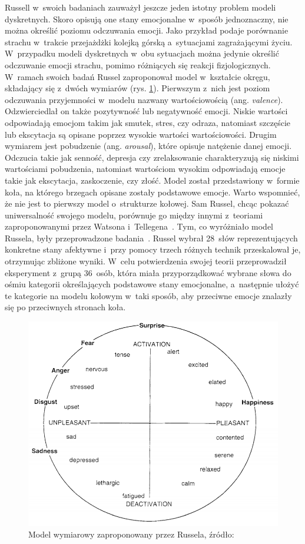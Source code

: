 Russell w~swoich badaniach zauważył jeszcze jeden istotny problem modeli dyskretnych. Skoro opisują one stany emocjonalne w~sposób jednoznaczny, nie można określić poziomu odczuwania emocji. Jako przykład podaje porównanie strachu w~trakcie przejażdżki kolejką górską a~sytuacjami zagrażającymi życiu. W~przypadku modeli dyskretnych w~obu sytuacjach można jedynie określić odczuwanie emocji strachu, pomimo różniących się reakcji fizjologicznych. W~ramach swoich badań Russel zaproponował model w~kształcie okręgu, składający się z~dwóch wymiarów (rys. \ref{fig:circumplex}). Pierwszym z~nich jest poziom odczuwania przyjemności w~modelu nazwany wartościowością (ang. \textit{valence}). Odzwierciedlał on także pozytywność lub negatywność emocji. Niskie wartości odpowiadają emocjom takim jak smutek, stres, czy odraza, natomiast szczęście lub ekscytacja są opisane poprzez wysokie wartości wartościowości. Drugim wymiarem jest pobudzenie (ang. \textit{arousal}), które opisuje natężenie danej emocji. Odczucia takie jak senność, depresja czy zrelaksowanie charakteryzują się niskimi wartościami pobudzenia, natomiast wartościom wysokim odpowiadają emocje takie jak ekscytacja, zaskoczenie, czy złość. Model został przedstawiony w~formie koła, na którego brzegach opisane zostały podstawowe emocje. Warto wspomnieć, że nie jest to pierwszy model o~strukturze kołowej. Sam Russel, chcąc pokazać uniwersalność swojego modelu, porównuje go między innymi z~teoriami zaproponowanymi przez Watsona i~Tellegena~\cite{Watson_1985}. Tym, co wyróżniało model Russela, były przeprowadzone badania~\cite{circumplex_model_russel_1980}. Russel wybrał 28~słów reprezentujących konkretne stany afektywne i~przy pomocy trzech różnych technik przeskalował je, otrzymując zbliżone wyniki. W~celu potwierdzenia swojej teorii przeprowadził eksperyment z~grupą 36~osób, która miała przyporządkować wybrane słowa do ośmiu kategorii określających podstawowe stany emocjonalne, a~następnie ułożyć te kategorie na modelu kołowym w~taki sposób, aby przeciwne emocje znalazły się po przeciwnych stronach koła.

\begin{figure}[h]
	\centering
	\includegraphics[width=0.6\linewidth]{images/circumplex.png}
	\caption{Model wymiarowy zaproponowany przez Russela, źródło: \cite{russel_barret_core_affect}}
	\label{fig:circumplex}
\end{figure}


